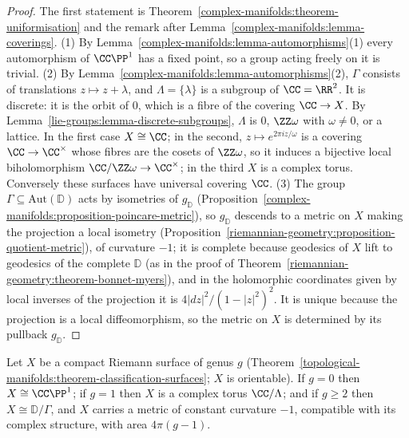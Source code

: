 \begin{proof}
The first statement is Theorem~\ref{complex-manifolds:theorem-uniformisation} and the remark after Lemma~\ref{complex-manifolds:lemma-coverings}. (1) By
Lemma~\ref{complex-manifolds:lemma-automorphisms}(1) every automorphism of $\CC\PP^1$ has a fixed point, so a group acting freely on it is trivial. (2) By
Lemma~\ref{complex-manifolds:lemma-automorphisms}(2), $\Gamma$ consists of translations $z \mapsto z + \lambda$, and $\Lambda = \{\lambda\}$ is a subgroup of $\CC = \RR^2$. It is
discrete: it is the orbit of $0$, which is a fibre of the covering $\CC \to X$. By Lemma~\ref{lie-groups:lemma-discrete-subgroups}, $\Lambda$ is $0$, $\ZZ\omega$ with
$\omega \neq 0$, or a lattice. In the first case $X \cong \CC$; in the second, $z \mapsto e^{2\pi iz/\omega}$ is a covering $\CC \to \CC^\times$ whose fibres are the cosets of
$\ZZ\omega$, so it induces a bijective local biholomorphism $\CC/\ZZ\omega \to \CC^\times$; in the third $X$ is a complex torus. Conversely these surfaces have universal covering
$\CC$. (3) The group $\Gamma \subseteq \mathrm{Aut}(\mathbb{D})$ acts by isometries of $g_{\mathbb{D}}$ (Proposition~\ref{complex-manifolds:proposition-poincare-metric}), so
$g_{\mathbb{D}}$ descends to a metric on $X$ making the projection a local isometry (Proposition~\ref{riemannian-geometry:proposition-quotient-metric}), of curvature $-1$; it is
complete because geodesics of $X$ lift to geodesics of the complete $\mathbb{D}$ (as in the proof of Theorem~\ref{riemannian-geometry:theorem-bonnet-myers}), and in the
holomorphic coordinates given by local inverses of the projection it is $4|dz|^2/(1 - |z|^2)^2$. It is unique because the projection is a local diffeomorphism, so the metric on
$X$ is determined by its pullback $g_{\mathbb{D}}$.
\end{proof}

\begin{corollary}\label{complex-manifolds:corollary-compact-uniformisation}
Let $X$ be a compact Riemann surface of genus $g$ (Theorem~\ref{topological-manifolds:theorem-classification-surfaces}; $X$ is orientable). If $g = 0$ then $X \cong \CC\PP^1$; if
$g = 1$ then $X$ is a complex torus $\CC/\Lambda$; and if $g \geq 2$ then $X \cong \mathbb{D}/\Gamma$, and $X$ carries a metric of constant curvature $-1$, compatible with its
complex structure, with area $4\pi(g - 1)$.
\end{corollary}

